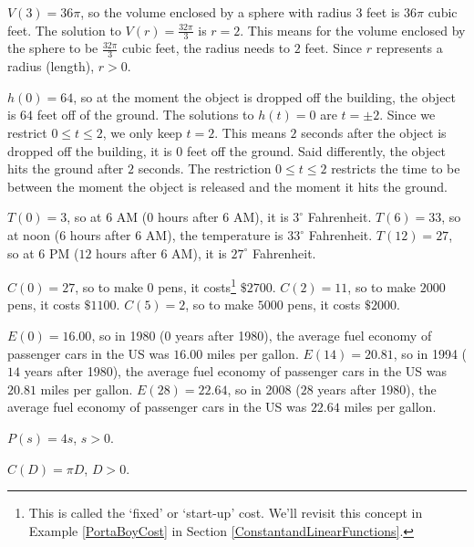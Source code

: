 \begin{exenum}
\item  $V(3) = 36\pi$, so the volume enclosed by a sphere with radius $3$ feet is $36\pi$ cubic feet.  The solution to $V(r) = \frac{32\pi}{3}$ is $r = 2$.  This means for the volume enclosed by the sphere to be $\frac{32\pi}{3}$ cubic feet, the radius needs to $2$ feet.  Since $r$ represents a radius (length), $r > 0$.


\item $h(0) = 64$, so at the moment the object is dropped off the building, the object is $64$ feet off of the ground.  The solutions to $h(t) = 0$ are $t = \pm 2$.  Since we restrict $0 \leq t \leq 2$, we only keep $t = 2$.  This means $2$ seconds after the object is dropped off the building, it is $0$ feet off the ground.  Said differently, the object hits the ground after $2$ seconds.  The restriction  $0 \leq t \leq 2$ restricts the time to be between the moment the object is released and the moment it hits the ground.


\item  $T(0) = 3$, so at 6 AM ($0$ hours after 6 AM), it is $3^{\circ}$ Fahrenheit.  $T(6) = 33$, so at noon ($6$ hours after 6 AM), the temperature is $33^{\circ}$ Fahrenheit.  $T(12) = 27$, so at 6 PM ($12$ hours after 6 AM), it is $27^{\circ}$ Fahrenheit.


\item $C(0) = 27$, so to make $0$ pens, it costs\footnote{This is called the `fixed' or `start-up' cost.  We'll revisit this concept in Example \ref{PortaBoyCost} in Section \ref{ConstantandLinearFunctions}.} $\$ 2700$.  $C(2) = 11$, so to make $2000$ pens, it costs $\$1100$.  $C(5) = 2$, so to make $5000$ pens, it costs $\$2000$.

\item $E(0) = 16.00$, so in 1980 ($0$ years after 1980), the average fuel economy of passenger cars in the US was $16.00$ miles per gallon.  $E(14) = 20.81$, so in 1994 ($14$ years after 1980), the average fuel economy of passenger cars in the US was $20.81$ miles per gallon.  $E(28) = 22.64$, so in 2008 ($28$ years after 1980), the average fuel economy of passenger cars in the US was $22.64$ miles per gallon.  


\item  $P(s) = 4s$, $s > 0$.

\item  $C(D) = \pi D$,  $D > 0$.

\item

\begin{enumerate}


\end{enumerate}
\end{exenum}
